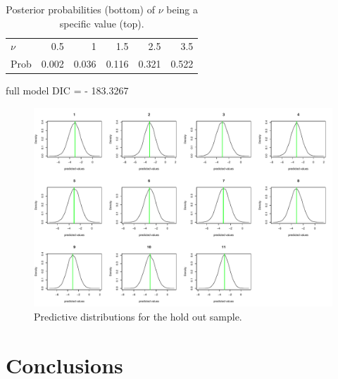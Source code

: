 \documentclass[12pt]{article}
\begin{document}
\begin{table}[ht]
\begin{center}
\begin{tabular}{lrrrrr}
\hline\hline
$\nu$ & 0.5 & 1 & 1.5 & 2.5 & 3.5 \\
Prob  & 0.002 & 0.036 & 0.116 & 0.321 & 0.522 \\
\hline\hline
\end{tabular}
\end{center}
\caption{Posterior probabilities (bottom) of $\nu$ being a specific value (top).}
\end{table}

full model DIC =  - 183.3267

\begin{figure}[ht]
\begin{center}
\includegraphics[scale=0.40]{figs/prediction.pdf}
\end{center}
\caption{Predictive distributions for the hold out sample.}
\end{figure}

\section{Conclusions}
\end{document}
